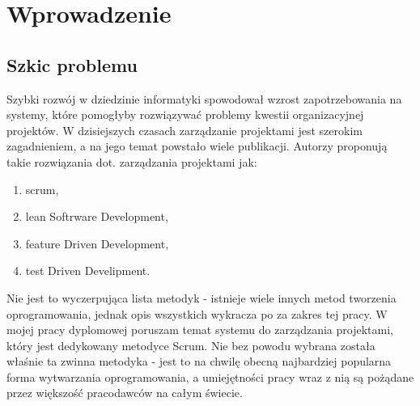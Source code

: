 \chapter{Wprowadzenie}
\section{Szkic problemu}

Szybki rozwój w dziedzinie informatyki spowodował wzrost zapotrzebowania na systemy, które pomogłyby rozwiązywać problemy kwestii organizacyjnej projektów. W dzisiejszych czasach zarządzanie projektami jest szerokim zagadnieniem, a na jego temat powstało wiele publikacji. Autorzy proponują takie rozwiązania dot. zarządzania projektami jak:
\begin{enumerate}
	\item scrum,
	\item lean Softrware Development,
	\item feature Driven Development,
	\item test Driven Develipment.
\end{enumerate}

Nie jest to wyczerpująca lista metodyk - istnieje wiele innych metod tworzenia oprogramowania, jednak opis wszystkich wykracza po za zakres tej pracy. W mojej pracy dyplomowej poruszam temat systemu do zarządzania projektami, który jest dedykowany metodyce Scrum. Nie bez powodu wybrana została właśnie ta zwinna metodyka - jest to na chwilę obecną najbardziej popularna forma wytwarzania oprogramowania, a umiejętności pracy wraz z nią są pożądane przez większość pracodawców na całym świecie.

